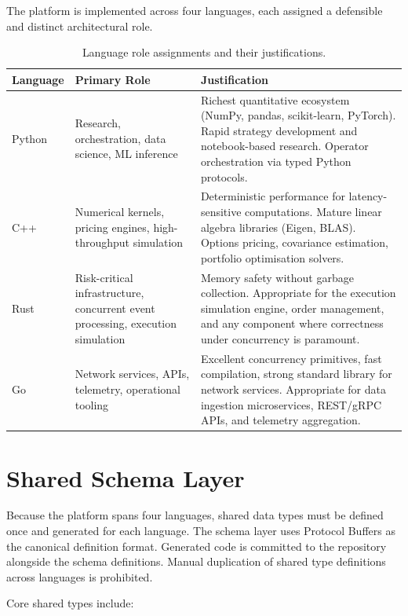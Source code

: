 \documentclass[12pt,openany]{book}
\numberwithin{equation}{chapter}
\theoremstyle{plain}
\theoremstyle{definition}
\theoremstyle{remark}
\begin{document}
The platform is implemented across four languages, each assigned a
defensible and distinct architectural role.

\begin{table}[H]
\centering
\caption{Language role assignments and their justifications.}
\label{tab:lang_roles}
\small
\begin{tabularx}{\textwidth}{p{1.8cm} p{3.8cm} p{9.0cm}}
\toprule
\textbf{Language} & \textbf{Primary Role} & \textbf{Justification} \\
\midrule
Python &
    Research, orchestration, data science, ML inference &
    Richest quantitative ecosystem (NumPy, pandas, scikit-learn, PyTorch).
    Rapid strategy development and notebook-based research. Operator
    orchestration via typed Python protocols. \\
\midrule
C++ &
    Numerical kernels, pricing engines, high-throughput simulation &
    Deterministic performance for latency-sensitive computations.
    Mature linear algebra libraries (Eigen, BLAS). Options pricing,
    covariance estimation, portfolio optimisation solvers. \\
\midrule
Rust &
    Risk-critical infrastructure, concurrent event processing,
    execution simulation &
    Memory safety without garbage collection. Appropriate for the
    execution simulation engine, order management, and any component
    where correctness under concurrency is paramount. \\
\midrule
Go &
    Network services, APIs, telemetry, operational tooling &
    Excellent concurrency primitives, fast compilation, strong standard
    library for network services. Appropriate for data ingestion
    microservices, REST/gRPC APIs, and telemetry aggregation. \\
\bottomrule
\end{tabularx}
\end{table}

\section{Shared Schema Layer}

Because the platform spans four languages, shared data types must be defined
once and generated for each language. The schema layer uses Protocol Buffers
as the canonical definition format. Generated code is committed to the
repository alongside the schema definitions. Manual duplication of shared
type definitions across languages is prohibited.

Core shared types include:
\end{document}
